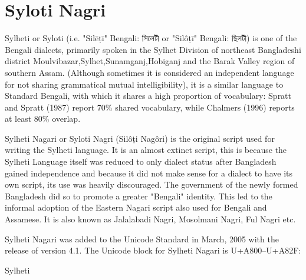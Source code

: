 \section{Syloti Nagri}
\newfontfamily{}
\newfontfamily{}

Sylheti or Syloti (i.e. "Silēṭī" Bengali: সিলেটী or "Silôṭī" Bengali: ছিলটী) is one of the Bengali dialects, primarily spoken in the Sylhet Division of northeast Bangladeshi district Moulvibazar,Sylhet,Sunamganj,Hobiganj and the Barak Valley region of southern Assam. (Although sometimes it is considered an independent language for not sharing grammatical mutual intelligibility), it is a similar language to Standard Bengali, with which it shares a high proportion of vocabulary: Spratt and Spratt (1987) report 70\% shared vocabulary, while Chalmers (1996) reports at least 80\% overlap.

Sylheti Nagari or Syloti Nagri (Silôṭi Nagôri) is the original script used for writing the Sylheti language. It is an almost extinct script, this is because the Sylheti Language itself was reduced to only dialect status after Bangladesh gained independence and because it did not make sense for a dialect to have its own script, its use was heavily discouraged. The government of the newly formed Bangladesh did so to promote a greater "Bengali" identity. This led to the informal adoption of the Eastern Nagari script also used for Bengali and Assamese. It is also known as Jalalabadi Nagri, Mosolmani Nagri, Ful Nagri etc.

Sylheti Nagari was added to the Unicode Standard in March, 2005 with the release of version 4.1.
The Unicode block for Sylheti Nagari is U+A800–U+A82F:

\begin{scriptexample}[]{Sylheti}
\end{scriptexample}


